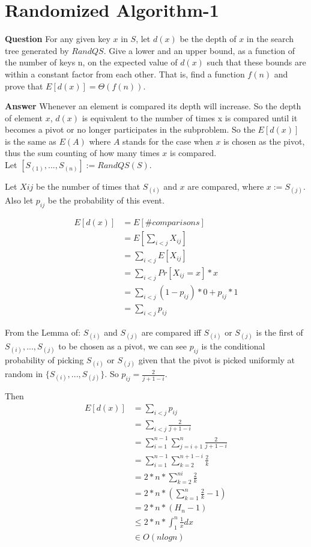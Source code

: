 \documentclass[12pt]{article}
\begin{document}
\section{Randomized Algorithm-1}
\textbf{Question}
For any given key $x$ in $S$, let $d(x)$ be the depth of $x$ in the search tree generated by $RandQS$. Give a lower and an upper bound, as a function of the number of keys n, on the expected value of $d(x)$ such that these bounds are within a constant factor from each other. That is, find a function $f(n)$ and prove that $E[d(x)]=\Theta(f(n))$.

\textbf{Answer}
Whenever an element is compared its depth will increase. So the depth of element $x$, $d(x)$ is equivalent to the number of times x is compared until it becomes a pivot or no longer participates in the subproblem. So the $E[d(x)]$ is the same as $E(A)$ where $A$ stands for the case when $x$ is chosen as the pivot, thus the sum counting of how many times $x$ is compared. \\

Let $[S_{(1)}, ..., S_{(n)}] := RandQS(S)$. 

Let $Xij$ be the number of times that $S_{(i)}$ and $x$ are compared, where $x:=S_{(j)}$. Also let $p_{ij}$ be the probability of this event.

\begin{equation}
\begin{aligned}
E[d(x)] &= E[\#comparisons] \\
&= E[\sum_{i<j} X_{ij}]\\
&=\sum_{i<j} E[X_{ij}]\\
&=\sum_{i<j} Pr[X_{ij} = x] * x\\
&= \sum_{i<j}  (1-p_{ij}) * 0 + p_{ij} * 1\\
&=  \sum_{i<j} p_{ij}
\end{aligned}
\end{equation}

From the Lemma of: $S_{(i)}$ and $S_{(j)}$ are compared iff $S_{(i)}$ or $S_{(j)}$ is the first of $S_{(i)}, ..., S_{(j)}$ to be chosen as a pivot, we can see $p_{ij}$ is the conditional probability of picking $S_{(i)}$ or $S_{(j)}$
 given that the pivot is picked uniformly at random in $\{S_{(i)}, ..., S_{(j)}\}$. So $p_{ij} = \frac{2}{j+1-i}$.
 
 Then 
\begin{equation}
\begin{aligned}
E[d(x)] &=  \sum_{i<j} p_{ij} \\
&=  \sum_{i<j}  \frac{2}{j+1-i}\\
&= \sum_{i=1}^{n-1} \sum_{j=i+1}^{n}  \frac{2}{j+1-i}\\
&= \sum_{i=1}^{n-1} \sum_{k=2}^{n+1-i}  \frac{2}{k}\\
&= 2*n*\sum_{k=2}^{ni}  \frac{2}{k}\\
&= 2*n*(\sum_{k=1}^{n}  \frac{2}{k}-1)\\
&=2*n*(H_{n}-1)\\
&\leq 2*n* \int_{1}^{n} \frac{1}{x} dx \\
&\in O(nlogn)
\end{aligned}
\end{equation}
\end{document}
